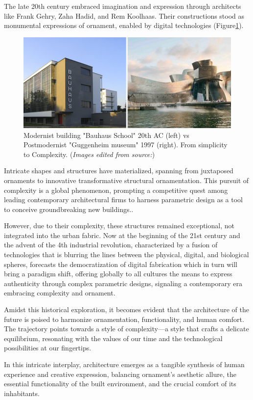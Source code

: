 The late 20th century embraced imagination and expression through architects like Frank Gehry, Zaha Hadid, and Rem Koolhaas.
Their constructions stood as monumental expressions of ornament, enabled by digital technologies (Figure\ref{fig:Modernismvspostmodernism}).

     \begin{figure}[htb]
          \centering
          \includegraphics[width= \linewidth]{Images/modernism vs postmodernism}
          \caption{Modernist building "Bauhaus School" 20th AC (left) vs Postmodernist "Guggenheim museum" 1997 (right). From simplicity to Complexity. (\textit{Images edited from source:\cite{Arora2023}})}
          \label{fig:Modernismvspostmodernism}
        \end{figure}

Intricate shapes and structures have materialized, spanning from juxtaposed ornaments to innovative transformative structural ornamentation.
This pursuit of complexity is a global phenomenon, prompting a competitive quest among leading contemporary architectural firms to harness parametric design as a tool to conceive groundbreaking new buildings.\cite{Burlando2019}.

However, due to their complexity, these structures remained exceptional, not integrated into the urban fabric.
Now at the beginning of the 21st century and the advent of the 4th industrial revolution, characterized by a fusion of technologies that is blurring the lines between the physical, digital, and biological spheres\cite{Schwab2016}, forecasts the democratization of digital fabrication which in turn will bring a paradigm shift, offering globally to all cultures the means to express authenticity through complex parametric designs, signaling a contemporary era embracing complexity and ornament.

Amidst this historical exploration, it becomes evident that the architecture of the future is poised to harmonize ornamentation, functionality, and human comfort.
The trajectory points towards a style of complexity—a style that crafts a delicate equilibrium, resonating with the values of our time and the technological possibilities at our fingertips.

In this intricate interplay, architecture emerges as a tangible synthesis of human experience and creative expression, balancing ornament's aesthetic allure, the essential functionality of the built environment, and the crucial comfort of its inhabitants.